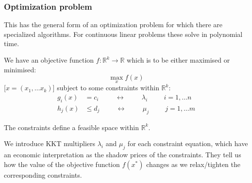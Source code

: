 \documentclass[10pt,aspectratio=169,dvipsnames]{beamer}
\newcommand{\R}{\mathbb{R}}
\def\l{\lambda}
\def\m{\mu}
\begin{document}
\begin{frame}
  \frametitle{Optimization problem}

This has the general form of an \alert{optimization problem} for which there are specialized algorithms. For \alert{continuous linear problems} these solve in \alert{polynomial time}.

We have an \alert{objective function} $f: \R^k \to \R$ which is to be either maximised or minimised:
\begin{equation*}
  \max_{x} f(x)
\end{equation*}
[$x = (x_1, \dots x_k)$] subject to some \alert{constraints} within $\R^k$:
\begin{align*}
  g_i(x) & = c_i \hspace{1cm}\leftrightarrow\hspace{1cm} \l_i \hspace{1cm} i = 1,\dots n \\
  h_j(x) & \leq d_j \hspace{1cm}\leftrightarrow\hspace{1cm} \m_j \hspace{1cm} j = 1,\dots m
\end{align*}


The constraints define a \alert{feasible space} within $\R^k$.


We introduce KKT multipliers $\l_i$ and $\m_j$ for each constraint
equation, which have an economic interpretation as the \alert{shadow
  prices} of the constraints. They tell us how the value
of the objective function $f(x^*)$ changes as we relax/tighten the
corresponding constraints.

\end{frame}
\end{document}
